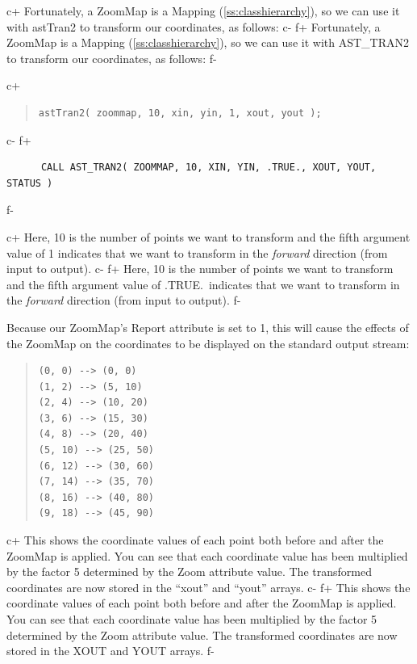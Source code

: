 \documentclass[twoside,11pt]{article}
\newcommand{\appref}[1]{Appendix~\ref{#1}}
\renewcommand{\appref}[1]{\ref{#1}}
\begin{document}
c+
Fortunately, a ZoomMap is a Mapping (\appref{ss:classhierarchy}), so we
can use it with astTran2 to transform our coordinates, as follows:
c-
f+
Fortunately, a ZoomMap is a Mapping (\appref{ss:classhierarchy}), so we
can use it with AST\_TRAN2 to transform our coordinates, as follows:
f-

c+
\begin{quote}
\small
\begin{verbatim}
astTran2( zoommap, 10, xin, yin, 1, xout, yout );
\end{verbatim}
\normalsize
\end{quote}
c-
f+
\small
\begin{verbatim}
      CALL AST_TRAN2( ZOOMMAP, 10, XIN, YIN, .TRUE., XOUT, YOUT, STATUS )
\end{verbatim}
\normalsize
f-

c+
Here, 10 is the number of points we want to transform and the fifth
argument value of 1 indicates that we want to transform in the
{\em{forward}} direction (from input to output).
c-
f+
Here, 10 is the number of points we want to transform and the fifth
argument value of .TRUE.\ indicates that we want to transform in the
{\em{forward}} direction (from input to output).
f-

Because our ZoomMap's Report attribute is set to 1, this will cause
the effects of the ZoomMap on the coordinates to be displayed on the
standard output stream:

\begin{quote}
\small
\begin{verbatim}
(0, 0) --> (0, 0)
(1, 2) --> (5, 10)
(2, 4) --> (10, 20)
(3, 6) --> (15, 30)
(4, 8) --> (20, 40)
(5, 10) --> (25, 50)
(6, 12) --> (30, 60)
(7, 14) --> (35, 70)
(8, 16) --> (40, 80)
(9, 18) --> (45, 90)
\end{verbatim}
\normalsize
\end{quote}

c+
This shows the coordinate values of each point both before and after
the ZoomMap is applied. You can see that each coordinate value has
been multiplied by the factor 5 determined by the Zoom attribute
value. The transformed coordinates are now stored in the ``xout'' and
``yout'' arrays.
c-
f+
This shows the coordinate values of each point both before and after
the ZoomMap is applied. You can see that each coordinate value has
been multiplied by the factor 5 determined by the Zoom attribute
value. The transformed coordinates are now stored in the XOUT and YOUT
arrays.
f-
\end{document}
